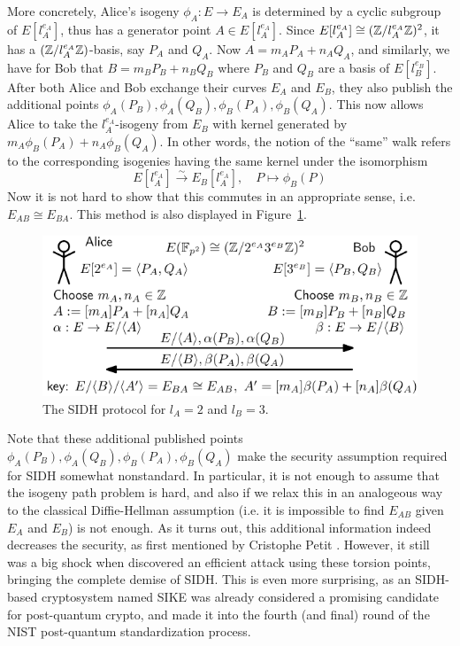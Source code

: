More concretely, Alice's isogeny $\phi_A: E \to E_A$ is determined by a cyclic subgroup of $E[l_A^{e_A}]$, thus has a generator point $A \in E[l_A^{e_A}]$.
Since $E[l_A^{e_A}] \cong (\mathbb{Z}/l_A^{e_A}\mathbb{Z})^2$, it has a $(\mathbb{Z}/l_A^{e_A}\mathbb{Z})$-basis, say $P_A$ and $Q_A$.
Now $A = m_A P_A + n_A Q_A$, and similarly, we have for Bob that $B = m_B P_B + n_B Q_B$ where $P_B$ and $Q_B$ are a basis of $E[l_B^{e_B}]$.
After both Alice and Bob exchange their curves $E_A$ and $E_B$, they also publish the additional points $\phi_A(P_B), \phi_A(Q_B), \phi_B(P_A), \phi_B(Q_A)$.
This now allows Alice to take the $l_A^{e_A}$-isogeny from $E_B$ with kernel generated by $m_A \phi_B(P_A) + n_A \phi_B(Q_A)$.
In other words, the notion of the ``same'' walk refers to the corresponding isogenies having the same kernel under the isomorphism
\begin{equation*}
    E[l_A^{e_A}] \overset{\sim}{\longrightarrow} E_B[l_A^{e_A}], \quad P \mapsto \phi_B(P)
\end{equation*}
Now it is not hard to show that this commutes in an appropriate sense, i.e. $E_{AB} \cong E_{BA}$.
This method is also displayed in Figure~\ref{fig:sidh}.
\begin{figure}
    \includegraphics[width = \textwidth]{./sidh.pdf}
    \caption{\label{fig:sidh} The SIDH protocol for $l_A = 2$ and $l_B = 3$.}
\end{figure}

Note that these additional published points $\phi_A(P_B), \phi_A(Q_B), \phi_B(P_A), \phi_B(Q_A)$ make the security assumption required for SIDH somewhat nonstandard.
In particular, it is not enough to assume that the isogeny path problem is hard, and also if we relax this in an analogeous way to the classical Diffie-Hellman assumption (i.e. it is impossible to find $E_{AB}$ given $E_A$ and $E_B$) is not enough.
As it turns out, this additional information indeed decreases the security, as first mentioned by Cristophe Petit \cite{torsion_point_attack}.
However, it still was a big shock when \cite{sidh_broken} discovered an efficient attack using these torsion points, bringing the complete demise of SIDH.
This is even more surprising, as an SIDH-based cryptosystem named SIKE \cite{sike} was already considered a promising candidate for post-quantum crypto, and made it into the fourth (and final) round of the NIST post-quantum standardization process.

